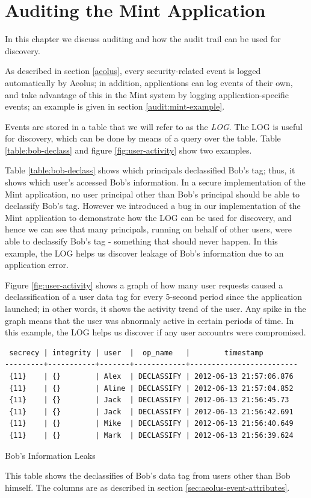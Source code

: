 \chapter{Auditing the Mint Application}
\label{mint:auditing}

In this chapter we discuss auditing and how the audit trail can be used for discovery.

As described in section \ref{aeolus}, every security-related event is logged automatically by Aeolus; in addition, applications can log events of their own, and take advantage of this in the Mint system by logging application-specific events; an example is given in section \ref{audit:mint-example}.

Events are stored in a table that we will refer to as the \emph{LOG}. The LOG is useful for discovery, which can be done by means of a query over the table. Table \ref{table:bob-declass} and figure \ref{fig:user-activity} show two examples.

Table \ref{table:bob-declass} shows which principals declassified Bob's tag; thus, it shows which user's accessed Bob's information. In a secure implementation of the Mint application, no user principal other than Bob's principal should be able to declassify Bob's tag. However we introduced a bug in our implementation of the Mint application to demonstrate how the LOG can be used for discovery, and hence we can see that many principals, running on behalf of other users, were able to declassify Bob's tag - something that should never happen. In this example, the LOG helps us discover leakage of Bob's information due to an application error.

Figure \ref{fig:user-activity} shows a graph of how many user requests caused a declassification of a user data tag for every 5-second period since the application launched; in other words, it shows the activity trend of the user. Any spike in the graph means that the user was abnormaly active in certain periods of time. In this example, the LOG helps us discover if any user accountrs were compromised.

\begin{table}[h]
\begin{verbatim}
 secrecy | integrity | user  |  op_name   |        timestamp        
---------+-----------+-------+------------+-------------------------
 {11}    | {}        | Alex  | DECLASSIFY | 2012-06-13 21:57:06.876
 {11}    | {}        | Aline | DECLASSIFY | 2012-06-13 21:57:04.852
 {11}    | {}        | Jack  | DECLASSIFY | 2012-06-13 21:56:45.73
 {11}    | {}        | Jack  | DECLASSIFY | 2012-06-13 21:56:42.691
 {11}    | {}        | Mike  | DECLASSIFY | 2012-06-13 21:56:40.649
 {11}    | {}        | Mark  | DECLASSIFY | 2012-06-13 21:56:39.624
\end{verbatim}
\caption*{Bob's Information Leaks}
\caption{This table shows the declassifies of Bob's data tag from users other than Bob himself. The columns are as described in section \ref{sec:aeolus-event-attributes}.}
\label{table:bob-declass}
\end{table}


